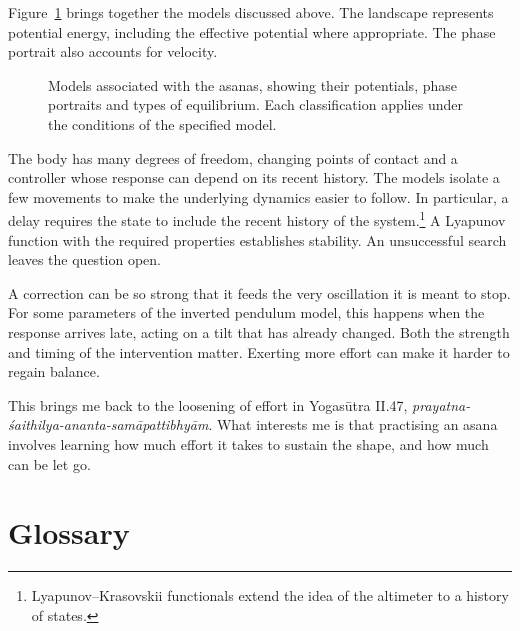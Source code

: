 Figure~\ref{fig:riepilogo} brings together the models discussed above. The landscape represents potential energy, including the effective potential where appropriate. The phase portrait also accounts for velocity.

\begin{figure}
\caption{Models associated with the asanas, showing their potentials, phase portraits and types of equilibrium. Each classification applies under the conditions of the specified model.}
\label{fig:riepilogo}
\end{figure}

The body has many degrees of freedom, changing points of contact and a controller whose response can depend on its recent history. The models isolate a few movements to make the underlying dynamics easier to follow. In particular, a delay requires the state to include the recent history of the system.\footnote{Lyapunov--Krasovskii functionals extend the idea of the altimeter to a history of states.} A Lyapunov function with the required properties establishes stability. An unsuccessful search leaves the question open.

A correction can be so strong that it feeds the very oscillation it is meant to stop. For some parameters of the inverted pendulum model, this happens when the response arrives late, acting on a tilt that has already changed. Both the strength and timing of the intervention matter. Exerting more effort can make it harder to regain balance.

This brings me back to the loosening of effort in Yogasūtra II.47, \emph{prayatna-śaithilya-ananta-samāpattibhyām}. What interests me is that practising an asana involves learning how much effort it takes to sustain the shape, and how much can be let go.

\section*{Glossary}

